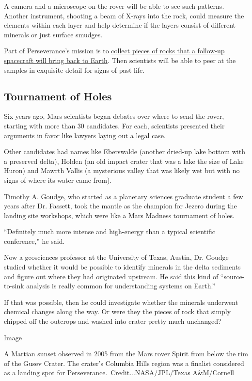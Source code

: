 A camera and a microscope on the rover will be able to see such
patterns. Another instrument, shooting a beam of X-rays into the rock,
could measure the elements within each layer and help determine if the
layers consist of different minerals or just surface smudges.

Part of Perseverance's mission is to
\href{https://www.nytimes3xbfgragh.onion/2020/07/28/science/mars-sample-return-mission.html}{collect
pieces of rocks that a follow-up spacecraft will bring back to Earth}.
Then scientists will be able to peer at the samples in exquisite detail
for signs of past life.

\hypertarget{tournament-of-holes}{%
\subsection{Tournament of Holes}\label{tournament-of-holes}}

Six years ago, Mars scientists began debates over where to send the
rover, starting with more than 30 candidates. For each, scientists
presented their arguments in favor like lawyers laying out a legal case.

Other candidates had names like Eberswalde (another dried-up lake bottom
with a preserved delta), Holden (an old impact crater that was a lake
the size of Lake Huron) and Mawrth Vallis (a mysterious valley that was
likely wet but with no signs of where its water came from).

Timothy A. Goudge, who started as a planetary sciences graduate student
a few years after Dr. Fassett, took the mantle as the champion for
Jezero during the landing site workshops, which were like a Mars Madness
tournament of holes.

``Definitely much more intense and high-energy than a typical scientific
conference,'' he said.

Now a geosciences professor at the University of Texas, Austin, Dr.
Goudge studied whether it would be possible to identify minerals in the
delta sediments and figure out where they had originated upstream. He
said this kind of ``source-to-sink analysis is really common for
understanding systems on Earth.''

If that was possible, then he could investigate whether the minerals
underwent chemical changes along the way. Or were they the pieces of
rock that simply chipped off the outcrops and washed into crater pretty
much unchanged?

Image

A Martian sunset observed in 2005 from the Mars rover Spirit from below
the rim of the Gusev Crater. The crater's Columbia Hills region was a
finalist considered as a landing spot for
Perseverance.~Credit...NASA/JPL/Texas A\&M/Cornell

